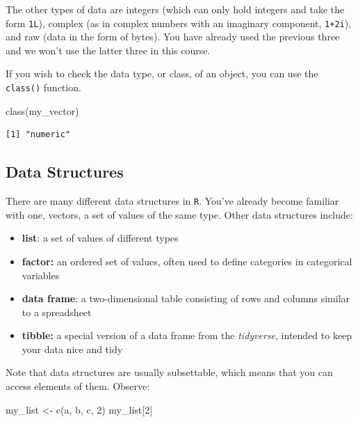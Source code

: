\documentclass[
  letterpaper,
]{book}
\newenvironment{Shaded}{\begin{snugshade}}{\end{snugshade}}
\newcommand{\DecValTok}[1]{\textcolor[rgb]{0.68,0.00,0.00}{#1}}
\newcommand{\FunctionTok}[1]{\textcolor[rgb]{0.28,0.35,0.67}{#1}}
\newcommand{\NormalTok}[1]{\textcolor[rgb]{0.00,0.23,0.31}{#1}}
\newcommand{\OtherTok}[1]{\textcolor[rgb]{0.00,0.23,0.31}{#1}}
\newcommand{\StringTok}[1]{\textcolor[rgb]{0.13,0.47,0.30}{#1}}
\providecommand{\tightlist}{%
  \setlength{\itemsep}{0pt}\setlength{\parskip}{0pt}}\usepackage{longtable,booktabs,array}
\begin{document}
The other types of data are integers (which can only hold integers and
take the form \texttt{1L}), complex (as in complex numbers with an
imaginary component, \texttt{1+2i}), and raw (data in the form of
bytes). You have already used the previous three and we won't use the
latter three in this course.

If you wish to check the data type, or class, of an object, you can use
the \texttt{class()} function.

\begin{Shaded}
\begin{Highlighting}[]
\FunctionTok{class}\NormalTok{(my\_vector)}
\end{Highlighting}
\end{Shaded}

\begin{verbatim}
[1] "numeric"
\end{verbatim}

\hypertarget{data-structures}{%
\subsection{Data Structures}\label{data-structures}}

There are many different data structures in \texttt{R}. You've already
become familiar with one, vectors, a set of values of the same type.
Other data structures include:

\begin{itemize}
\tightlist
\item
  \textbf{list}: a set of values of different types
\item
  \textbf{factor:} an ordered set of values, often used to define
  categories in categorical variables
\item
  \textbf{data frame}: a two-dimensional table consisting of rows and
  columns similar to a spreadsheet
\item
  \textbf{tibble:} a special version of a data frame from the
  \emph{tidyverse}, intended to keep your data nice and tidy
\end{itemize}

Note that data structures are usually subsettable, which means that you
can access elements of them. Observe:

\begin{Shaded}
\begin{Highlighting}[]
\NormalTok{my\_list }\OtherTok{\textless{}{-}} \FunctionTok{c}\NormalTok{(}\StringTok{\textquotesingle{}a\textquotesingle{}}\NormalTok{, }\StringTok{\textquotesingle{}b\textquotesingle{}}\NormalTok{, }\StringTok{\textquotesingle{}c\textquotesingle{}}\NormalTok{, }\DecValTok{2}\NormalTok{)}
\NormalTok{my\_list[}\DecValTok{2}\NormalTok{]}
\end{Highlighting}
\end{Shaded}
\end{document}
